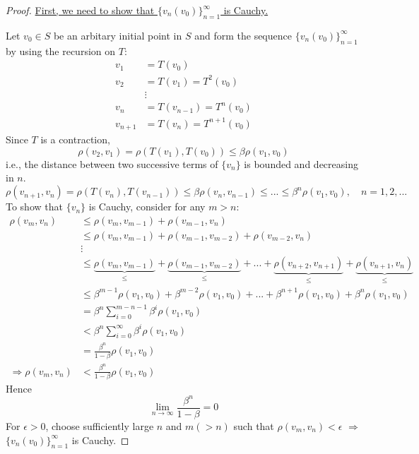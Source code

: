 \documentclass[twoside]{article}
\newcommand\imp{$\Longrightarrow$}
\begin{document}
\begin{proof}
    \underline{First, we need to show that $\{v_{n}(v_{0})\}_{n=1}^{\infty}$ is Cauchy.}

    Let $v_{0} \in S$ be an arbitary initial point in $S$ and form the sequence $\{v_{n}(v_{0})\}_{n=1}^{\infty}$ by using the recursion on $T$:
    \[
    \begin{array}{ll}
        v_{1} &= T(v_{0})\\
        v_{2} &= T(v_{1}) = T^{2}(v_{0})\\
              &\vdots \\
        v_{n} &= T(v_{n-1}) = T^{n}(v_{0})\\
        v_{n+1} &= T(v_{n}) = T^{n+1}(v_{0})
    \end{array}
    \]
    Since $T$ is a contraction, 
    \[
    \rho(v_{2},v_{1}) = \rho(T(v_{1}),T(v_{0})) \leq \beta \rho(v_{1},v_{0})
    \]
    i.e., the distance between two successive terms of $\{v_{n}\}$ is bounded and decreasing in $n$.
    \[
    \rho(v_{n+1},v_{n}) = \rho(T(v_{n}),T(v_{n-1})) \leq \beta \rho(v_{n},v_{n-1}) \leq ... \leq \beta^{n} \rho(v_{1},v_{0}) , \quad n = 1,2,...
    \]
    To show that $\{ v_{n} \}$ is Cauchy, consider for any $m > n$:
    \[
    \begin{aligned}
        \rho(v_{m},v_{n}) 
        & \leq \rho(v_{m},v_{m-1}) + \rho(v_{m-1},v_{n})\\
        & \leq \rho(v_{m},v_{m-1}) + \rho(v_{m-1},v_{m-2}) + \rho(v_{m-2},v_{n})\\
        & \vdots\\
        & \leq \underbrace{\rho(v_{m},v_{m-1})}_{\leq} + \underbrace{\rho(v_{m-1},v_{m-2})}_{\leq} + ... + \underbrace{\rho(v_{n+2},v_{n+1})}_{\leq} + \underbrace{\rho(v_{n+1},v_{n})}_{\leq}\\
        & \leq \beta^{m-1} \rho(v_1,v_0) + \beta^{m-2} \rho(v_1,v_0) + ... + \beta^{n+1} \rho(v_1,v_0)+ \beta^{n} \rho(v_1,v_0)\\
        & = \beta^{n} \sum_{i = 0}^{m-n-1} \beta^{i} \rho(v_1,v_0)\\
        & < \beta^{n} \sum_{i = 0}^{\infty} \beta^{i} \rho(v_1,v_0)\\
        &= \frac{\beta^{n}}{1- \beta} \rho(v_1,v_0)\\
        \Longrightarrow \rho(v_{m},v_{n}) &< \frac{\beta^{n}}{1- \beta} \rho(v_1,v_0)
    \end{aligned}
    \]
    Hence
    \[
    \lim_{n \to \infty} \frac{\beta^{n}}{1- \beta} = 0
    \]
    For $\epsilon >0$, choose sufficiently large $n$ and $m (> n)$ such that $\rho(v_{m}, v_{n}) < \epsilon$ \imp $\{ v_{n}(v_{0}) \}_{n=1}^{\infty}$ is Cauchy.


\end{proof}
\end{document}
